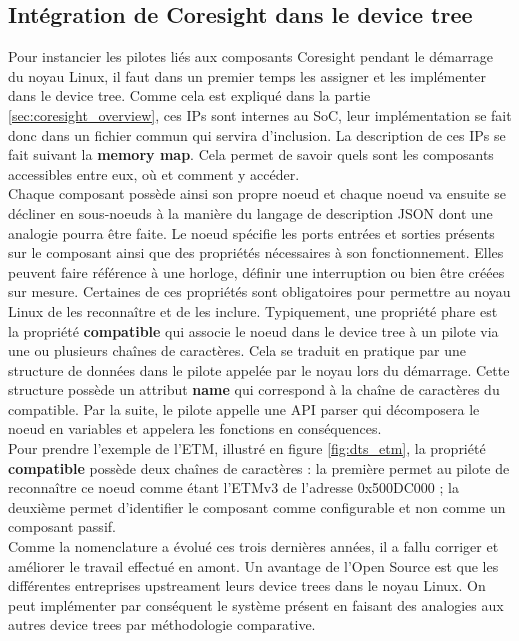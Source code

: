\subsection{Intégration de Coresight dans le device tree}
\label{sec:coresight_integration}

Pour instancier les pilotes liés aux composants Coresight pendant le démarrage
du noyau Linux, il faut dans un premier temps les assigner et les implémenter
dans le device tree.  Comme cela est expliqué dans la partie
\ref{sec:coresight_overview}, ces IPs sont internes au SoC, leur
implémentation se fait donc dans un fichier commun qui servira d'inclusion.
La description de ces IPs se fait suivant la \textbf{memory map}. Cela permet
de savoir quels sont les composants accessibles entre eux, où et comment y
accéder. \\

Chaque composant possède ainsi son propre noeud et chaque noeud va ensuite se
décliner en sous-noeuds à la manière du langage de description JSON dont une
analogie pourra être faite. Le noeud spécifie les ports entrées et sorties
présents sur le composant ainsi que des propriétés nécessaires à son
fonctionnement. Elles peuvent faire référence à une horloge, définir une
interruption ou bien être créées sur mesure. Certaines de ces propriétés sont
obligatoires pour permettre au noyau Linux de les reconnaître et de les
inclure. Typiquement, une propriété phare est la propriété \textbf{compatible}
qui associe le noeud dans le device tree à un pilote via une ou plusieurs
chaînes de caractères. Cela se traduit en pratique par une structure de
données dans le pilote appelée par le noyau lors du démarrage. Cette structure
possède un attribut \textbf{name} qui correspond à la chaîne de caractères du
compatible. Par la suite, le pilote appelle une API parser qui décomposera le
noeud en variables et appelera les fonctions en conséquences. \\

Pour prendre l'exemple de l'ETM, illustré en figure \ref{fig:dts_etm}, la
propriété \textbf{compatible} possède deux chaînes de caractères : la première
permet au pilote de reconnaître ce noeud comme étant l'ETMv3 de l'adresse
0x500DC000 ; la deuxième permet d'identifier le composant comme configurable
et non comme un composant passif. \\

Comme la nomenclature a évolué ces trois dernières années, il a fallu corriger
et améliorer le travail effectué en amont. Un avantage de l'Open Source est
que les différentes entreprises upstreament leurs device trees dans le noyau
Linux. On peut implémenter par conséquent le système présent en faisant des
analogies aux autres device trees par méthodologie comparative. \\

